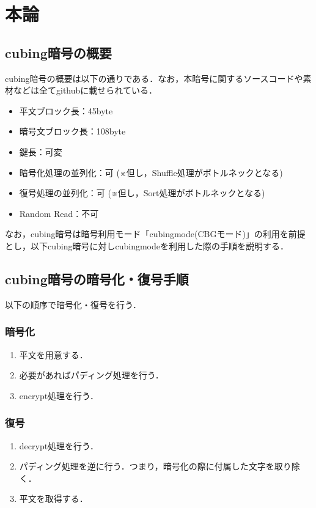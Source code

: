 \documentclass{jsarticle}
\begin{document}
\section{本論}
\subsection{cubing暗号の概要}
cubing暗号の概要は以下の通りである．なお，本暗号に関するソースコードや素材などは全てgithubに載せられている．\cite{github}

\begin{itemize}
  \item 平文ブロック長：45byte
  \item 暗号文ブロック長：108byte
  \item 鍵長：可変
  \item 暗号化処理の並列化：可 (※但し，Shuffle処理がボトルネックとなる)
  \item 復号処理の並列化：可 (※但し，Sort処理がボトルネックとなる)
  \item Random Read：不可
\end{itemize}
なお，cubing暗号は暗号利用モード「cubingmode(CBGモード)」の利用を前提とし，以下cubing暗号に対しcubingmodeを利用した際の手順を説明する．
\subsection{cubing暗号の暗号化・復号手順}

以下の順序で暗号化・復号を行う．

\subsubsection{暗号化}
\begin{enumerate}
\item 平文を用意する．
\item 必要があればパディング処理を行う．
\item encrypt処理を行う．
\end{enumerate}

\subsubsection{復号}
\begin{enumerate}
\item decrypt処理を行う．
\item パディング処理を逆に行う．つまり，暗号化の際に付属した文字を取り除く．
\item 平文を取得する．
\end{enumerate}
\end{document}
